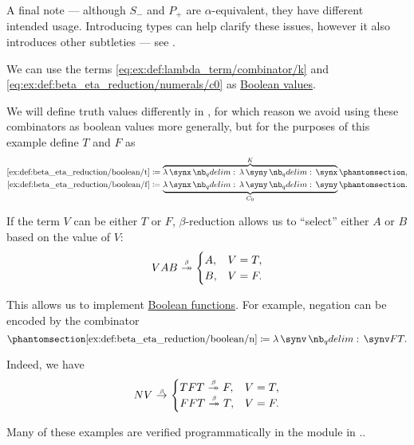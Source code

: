 \begin{example}
\begin{thmenum}
    A final note --- although \( S_- \) and \( P_+ \) are \( \alpha \)-equivalent, they have different intended usage. Introducing types can help clarify these issues, however it also introduces other subtleties --- see .

     We can use the terms \ref{eq:ex:def:lambda_term/combinator/k} and \ref{eq:ex:def:beta_eta_reduction/numerals/c0} as \hyperref[con:boolean_value]{Boolean values}.

    We will define truth values differently in , for which reason we avoid using these combinators as boolean values more generally, but for the purposes of this example define \( T \) and \( F \) as
    \begin{align*}
      \ref{ex:def:beta_eta_reduction/boolean/t} &\coloneqq \overbrace{\qabs \synx \qabs \syny \synx}^K \taglabel[T]{ex:def:beta_eta_reduction/boolean/t}, \\
      \ref{ex:def:beta_eta_reduction/boolean/f} &\coloneqq \underbrace{\qabs \synx \qabs \syny \syny}_{C_0} \taglabel[F]{ex:def:beta_eta_reduction/boolean/f}.
    \end{align*}

    If the term \( V \) can be either \( T \) or \( F \), \( \beta \)-reduction allows us to \enquote{select} either \( A \) or \( B \) based on the value of \( V \):
    \begin{equation}\label{ex:def:beta_eta_reduction/boolean/if}
      VAB \bred* \begin{cases}
        A, &V = T, \\
        B, &V = F.
      \end{cases}
    \end{equation}

    This allows us to implement \hyperref[def:boolean_function]{Boolean functions}. For example, negation can be encoded by the combinator
    \begin{equation*}\taglabel[N]{ex:def:beta_eta_reduction/boolean/n}
      \ref{ex:def:beta_eta_reduction/boolean/n} \coloneqq \qabs \synv \synv F T.
    \end{equation*}

    Indeed, we have
    \begin{equation*}
      NV \bred \begin{cases}
        TFT \bred* F, &V = T, \\
        FFT \bred* T, &V = F.
      \end{cases}
    \end{equation*}
  \end{thmenum}
\end{example}
\begin{comments}
  \item Many of these examples are verified programmatically in the module  in \cite{notebook:code}..
\end{comments}

